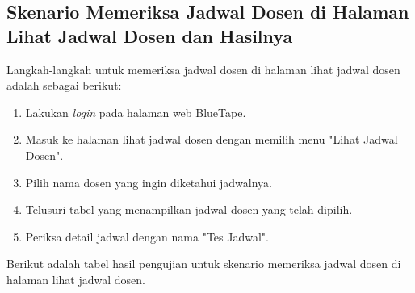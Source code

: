 \subsection{Skenario Memeriksa Jadwal Dosen di Halaman Lihat Jadwal Dosen dan Hasilnya}
\label{subsec:skenario_memeriksa_jadwal_dosen_di_halaman_lihat_jadwal_dosen}
Langkah-langkah untuk memeriksa jadwal dosen di halaman lihat jadwal dosen adalah sebagai berikut:

\begin{enumerate}
    \item Lakukan \textit{login} pada halaman web BlueTape.
    \item Masuk ke halaman lihat jadwal dosen dengan memilih menu "Lihat Jadwal Dosen".
    \item Pilih nama dosen yang ingin diketahui jadwalnya.
    \item Telusuri tabel yang menampilkan jadwal dosen yang telah dipilih.
    \item Periksa detail jadwal dengan nama "Tes Jadwal".
\end{enumerate}

Berikut adalah tabel hasil pengujian untuk skenario memeriksa jadwal dosen di halaman lihat jadwal dosen.

